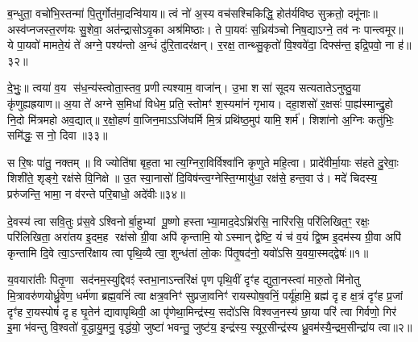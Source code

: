 ब॒न्धुता॒ वचो॑भि॒स्तन्मा॑ पि॒तुर्गोत॑मा॒दन्वि॑याय॥ त्वं नो॑ अ॒स्य वच॑सश्चिकिद्धि॒ होत॑र्यविष्ठ सुक्रतो॒ दमू॑नाः॥ अस्व॑प्नजस्त॒रण॑यः सु॒शेवा॒ अत॑न्द्रासोऽवृ॒का अश्र॑मिष्ठाः। ते पा॒यवः॑ स॒ध्रिय॑ञ्चो निष॒द्याऽग्ने॒ तव॑ नः पान्त्वमूर॥ ये पा॒यवो॑ मामते॒यं ते॑ अग्ने॒ पश्य॑न्तो अ॒न्धं दु॑रि॒तादर॑क्षन्। र॒रक्ष॒ तान्थ्सु॒कृतो॑ वि॒श्ववे॑दा॒ दिफ्स॑न्त॒ इद्रि॒पवो॒ ना ह॑॥३२॥

दे॒भुः॒॥ त्वया॑ व॒य स॑ध॒न्य॑स्त्वोता॒स्तव॒ प्रणीत्यश्याम॒ वाजा॑न्। उ॒भा शसा॑ सूदय सत्यतातेऽनुष्ठु॒या कृ॑णुह्यह्रयाण॥ अ॒या ते॑ अग्ने स॒मिधा॑ विधेम॒ प्रति॒ स्तोमꣳ॑ श॒स्यमा॑नं गृभाय। दहा॒शसो॑ र॒क्षसः॑ पा॒ह्य॑स्मान्द्रु॒हो नि॒दो मि॑त्रमहो अव॒द्यात्॥ र॒क्षो॒हणं॑ वा॒जिन॒माऽऽजि॑घर्मि मि॒त्रं प्रथि॑ष्ठ॒मुप॑ यामि॒ शर्म॑। शिशा॑नो अ॒ग्निः कतु॑भिः॒ समि॑द्धः॒ स नो॒ दिवा॥३३॥

स रि॒षः पा॑तु॒ नक्तम्॥ वि ज्योति॑षा बृह॒ता भात्य॒ग्निरा॒विर्विश्वा॑नि कृणुते महि॒त्वा। प्रादे॑वीर्मा॒याः स॑हते दु॒रेवाः॒ शिशी॑ते॒ शृङ्गे॒ रक्ष॑से वि॒निक्षे॥ उ॒त स्वा॒नासो॑ दि॒विष॑न्त्व॒ग्नेस्ति॒ग्मायु॑धा॒ रक्ष॑से॒ हन्त॒वा उ॑। मदे॑ चिदस्य॒ प्ररु॑जन्ति॒ भामा॒ न व॑रन्ते परि॒बाधो॒ अदे॑वीः॥३४॥

{}

{}

\setcounter{anuvakam}{0}
दे॒वस्य॑ त्वा सवि॒तुः प्र॑स॒वेऽश्विनोर्बा॒हुभ्यां पू॒ष्णो हस्ताभ्या॒माद॒देऽभ्रि॑रसि॒ नारि॑रसि॒ परि॑लिखित॒ꣳ॒ रक्षः॒ परि॑लिखिता॒ अरा॑तय इ॒दम॒ह रक्ष॑सो ग्री॒वा अपि॑ कृन्तामि॒ योऽस्मान् द्वेष्टि॒ यं च॑ व॒यं द्वि॒ष्म इ॒दम॑स्य ग्री॒वा अपि॑ कृन्तामि दि॒वे त्वा॒ऽन्तरि॑क्षाय त्वा पृथि॒व्यै त्वा॒ शुन्ध॑तां लो॒कः पि॑तृ॒षद॑नो॒ यवो॑ऽसि य॒वया॒स्मद्द्वेषः॑॥१॥

य॒वयारा॑तीः पितृ॒णा सद॑नम॒स्युद्दिवꣵ॑ स्तभा॒नाऽन्तरि॑क्षं पृण पृथि॒वीं दृꣳ॑ह द्युता॒नस्त्वा॑ मारु॒तो मि॑नोतु मि॒त्रावरु॑णयोर्ध्रु॒वेण॒ धर्म॑णा ब्रह्म॒वनिं॑ त्वा क्षत्र॒वनिꣳ॑ सुप्रजा॒वनिꣳ॑ रायस्पोष॒वनिं॒ पर्यू॑हामि॒ ब्रह्म॑ दृह क्ष॒त्रं दृꣳ॑ह प्र॒जां दृꣳ॑ह रा॒यस्पोषं॑ दृह घृ॒तेन॑ द्यावापृथिवी॒ आ पृ॑णेथा॒मिन्द्र॑स्य॒ सदो॑ऽसि विश्वज॒नस्य॑ छा॒या परि॑ त्वा गिर्वणो॒ गिर॑ इ॒मा भ॑वन्तु वि॒श्वतो॑ वृ॒द्धायु॒मनु॒ वृद्ध॑यो॒ जुष्टा॑ भवन्तु॒ जुष्ट॑य॒ इन्द्र॑स्य॒ स्यूर॒सीन्द्र॑स्य ध्रु॒वम॑स्यै॒न्द्रम॒सीन्द्रा॑य त्वा॥२॥


